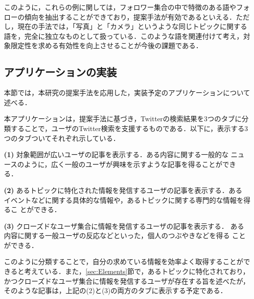 このように，これらの例に関しては，フォロワー集合の中で特徴のある語やフォ
ローの傾向を抽出することができており，提案手法が有効であるといえる．ただ
し，現在の手法では，「写真」と「カメラ」というような同じトピックに関する
語を，完全に独立なものとして扱っている．このような語を関連付けて考え，対
象限定性を求める有効性を向上させることが今後の課題である．

\subsection{アプリケーションの実装}
\label{sec:Application}

本節では，本研究の提案手法を応用した，実装予定のアプリケーションについて
述べる．

本アプリケーションは，提案手法に基づき，Twitterの検索結果を3つのタブに分
類することで，ユーザのTwitter検索を支援するものである．以下に，表示する3
つのタブついてそれぞれ示している．\vspace{1ex}

{\bf (1)} 対象範囲が広いユーザの記事を表示する．ある内容に関する一般的な
ニュースのように，広く一般のユーザが興味を示すような記事を得ることができ
る．\vspace{1ex}

{\bf (2)} あるトピックに特化された情報を発信するユーザの記事を表示する．ある
イベントなどに関する具体的な情報や，あるトピックに関する専門的な情報を得るこ
とができる．\vspace{1ex}

{\bf (3)} クローズドなユーザ集合に情報を発信するユーザの記事を表示する．
ある内容に関する一般ユーザの反応などといった，個人のつぶやきなどを得る
ことができる．\vspace{1ex}

このように分類することで，自分の求めている情報を効率よく取得することがで
きると考えている．また，\ref{sec:Elements}節で，あるトピックに特化されており，
かつクローズドなユーザ集合に情報を発信するユーザが存在する旨を述べたが，
そのような記事は，上記の(2)と(3)の両方のタブに表示する予定である．